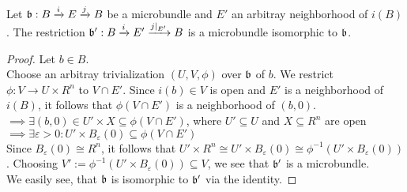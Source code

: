 
 \\
Let $\bundleb: \bundle{B}{E}{i}{j}$ be a microbundle and $E'$ an arbitray neighborhood of $i(B)$.
The restriction $\bundleb':\bundle{B}{E'}{i}{j\restrict{E'}}$ is a microbundle isomorphic to $\bundleb$.
\begin{proof}
Let $b \in B$. \\
Choose an arbitray trivialization $(U, V, \phi)$ over $\bundleb$ of $b$.
We restrict $\phi: V \to U \times R^n$ to $V \cap E'$.
Since $i(b) \in V$ is open and $E'$ is a neighborhood of $i(B)$, it follows that $\phi(V \cap E')$ is a neighborhood of $(b, 0)$.
\\ $\implies \exists (b, 0) \in U' \times X \subseteq \phi(V \cap E')$, where $U' \subseteq U$ and $X \subseteq R^n$ are open
\\ $\implies \exists \varepsilon > 0: U' \times B_\varepsilon(0) \subseteq \phi(V \cap E')$ \\
Since $B_\varepsilon(0) \cong R^n$, it follows that $U' \times R^n \cong U' \times B_\varepsilon(0) \cong \phi^{-1}(U' \times B_\varepsilon(0))$.
Choosing $V' := \phi^{-1}(U' \times B_\varepsilon(0)) \subseteq V$, we see that $\bundleb'$ is a microbundle.
\\ We easily see, that $\bundleb$ is isomorphic to $\bundleb'$ via the identity.
\end{proof}